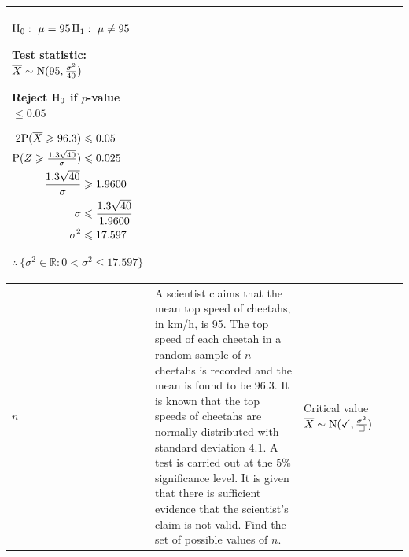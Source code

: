\begin{landscape}
{\begin{longtable}{|M{1.0cm}|L{5.0cm}|L{2.3cm}|L{6.4cm}|L{6.4cm}|}
$\mathrm{H}_{0}:\ \mu=95$\newline $\mathrm{H}_{1}:\ \mu\neq95$\par\smallskip Test statistic:\newline $\overline{X}\sim\mathrm{N}(95,\tfrac{\sigma^{2}}{40})$\par{\centering{}\par}Reject $\mathrm{H}_{0}$ if $p$-value $\leqslant0.05$\par\smallskip $\begin{aligned}2\mathrm{P}(\overline{X}\geqslant96.3)&\leqslant0.05\\\mathrm{P}(Z\geqslant\tfrac{1.3\sqrt{40}}{\sigma})&\leqslant0.025\\\dfrac{1.3\sqrt{40}}{\sigma}&\geqslant1.9600\\\sigma&\leqslant\dfrac{1.3\sqrt{40}}{1.9600}\\\sigma^{2}&\leqslant17.597\end{aligned}$\par\smallskip $\therefore\ \{\sigma^{2}\in\mathbb{R}:0<\sigma^{2}\leqslant17.597\}$\\\hline
$n$ &
A scientist claims that the mean top speed of cheetahs, in km/h, is 95. The top speed of each cheetah in a random sample of $n$ cheetahs is recorded and the mean is found to be 96.3. It is known that the top speeds of cheetahs are normally distributed with standard deviation 4.1. A test is carried out at the 5\% significance level. It is given that there is sufficient evidence that the scientist's claim is not valid. Find the set of possible values of $n$. &
Critical value\newline $\overline{X}\sim\mathrm{N}(\checkmark,\tfrac{\sigma^{2}}{\square})$ &

\end{longtable}}
\end{landscape}
